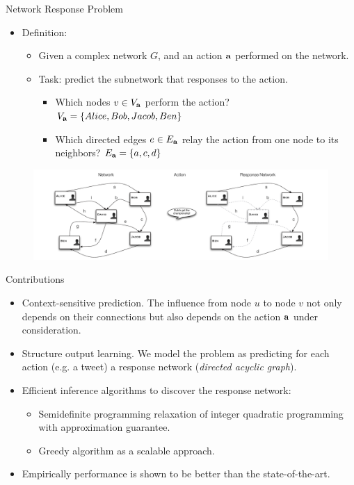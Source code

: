 \documentclass[first=dgreen,second=purple,logo=yellowexc]{aaltoslides}
\newcommand{\ab}{{\bf a}}
\begin{document}
\begin{frame}{Network Response Problem}
	\begin{itemize}
		\item Definition:
		\begin{itemize}
			\item Given a complex network $G$, and an action $\ab$ performed on the network.
			\item Task: predict the subnetwork that responses to the action.
			\begin{itemize}
				\item Which nodes $v\in V_{\ab}$ perform the action? $V_{\ab}=\{Alice,Bob,Jacob,Ben\}$
				\item Which directed edges $e\in E_{\ab}$ relay the action from one node to its neighbors? $E_{\ab}=\{a,c,d\}$
			\end{itemize}
		\end{itemize}
	\end{itemize}
	\vspace{-10mm}
	\begin{figure}
		\center
		\includegraphics[scale=0.25]{./plots/problem_definition.pdf}
	\end{figure}
\end{frame}


\begin{frame}{Contributions}
	\begin{itemize}
		\item {\color{aaltoPurple} Context-sensitive prediction}. The influence from node $u$ to node $v$ not only depends on their connections but also depends on the action $\ab$ under consideration.
		\item {\color{aaltoPurple} Structure output learning}. We model the problem as predicting for each action (e.g. a tweet) a response network ({\em directed acyclic graph}).
		\item {\color{aaltoPurple} Efficient inference algorithms to discover the response network:}
		\begin{itemize}
			\item {\color{aaltoPurple} Semidefinite programming relaxation} of integer quadratic programming with approximation guarantee.
			\item {\color{aaltoPurple} Greedy algorithm} as a scalable approach.
		\end{itemize}
		\item {\color{aaltoPurple} Empirically performance} is shown to be better than the state-of-the-art.
	\end{itemize}
\end{frame}
\end{document}
